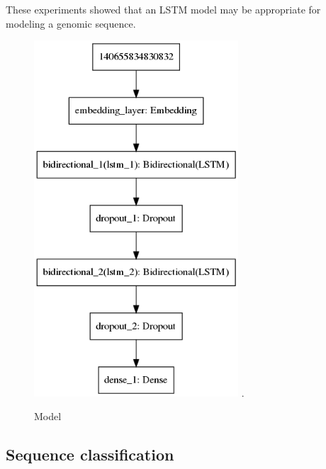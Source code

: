 \documentclass[conference]{IEEEtran}
\begin{document}
These experiments showed that an LSTM model may be appropriate for modeling a genomic sequence.



\begin{figure}[h]
\centering
\includegraphics[width=3in]{model.png}
\DeclareGraphicsExtensions.
\caption{Model}
\label{fig_sim}
\end{figure}

\subsection{Sequence classification}
\end{document}
